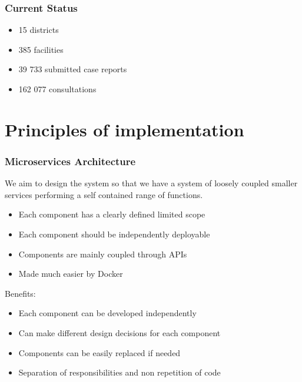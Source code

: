 \documentclass{beamer}
\begin{document}
\begin{frame}
  \frametitle{Current Status}

  \begin{itemize}
  \item 15 districts
  \item 385 facilities
  \item  39 733 submitted case reports
  \item 162 077 consultations
  \end{itemize}
\end{frame}


\section{Principles of implementation}

\begin{frame}
  \frametitle{Microservices Architecture}
  We aim to design the system so that we have a system of loosely coupled smaller services performing a self contained range of functions.

  \begin{itemize}
  \item Each component has a clearly defined limited scope
  \item Each component should be independently deployable
  \item Components are mainly coupled through APIs
  \item Made much easier by Docker
  \end{itemize}

  Benefits:

  \begin{itemize}
  \item Each component can be developed independently
  \item Can make different design decisions for each component
  \item Components can be easily replaced if needed
  \item Separation of responsibilities and non repetition of code
    \end{itemize}
\end{frame}
\end{document}
